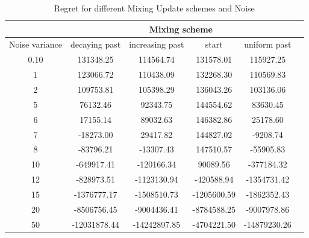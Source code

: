 \documentclass[12pt, twoside]{article}
\begin{document}
\begin{table}[H]
\centering
\caption{Regret for different Mixing Update schemes and Noise}
\label{tab:alpha}

\begin{tabular}{c|ccccc}
\toprule
& \multicolumn{4}{c}{Mixing scheme} \\
\toprule
{Noise variance} & \centering decaying past & \centering increasing past & \centering start & \centering uniform past &  \\
\midrule
0.10 & 131348.25 & 114564.74 & 131578.01 & 115927.25 \\

1 & 123066.72 & 110438.09 & 132268.30 & 110569.83 \\

2 & 109753.81 & 105398.29 & 136043.26 & 103136.06 \\

5 & 76132.46 & 92343.75 & 144554.62 & 83630.45 \\

6 & 17155.14 & 89032.63 & 146382.86 & 25178.60 \\

7 & -18273.00 & 29417.82 & 144827.02 & -9208.74 \\

8 & -83796.21 & -13307.43 & 147510.57 & -55905.83 \\


10 & -649917.41 & -120166.34 & 90089.56 & -377184.32 \\


12 & -828973.51 & -1123130.94 & -420588.94 & -1354731.42 \\



15 & -1376777.17 & -1508510.73 & -1205600.59 & -1862352.43 \\

20 & -8506756.45 & -9004436.41 & -8784588.25 & -9007978.86 \\

50 & -12031878.44 & -14242897.85 & -4704221.50 & -14879230.26 \\
\bottomrule
\end{tabular}
\end{table}
\end{document}
